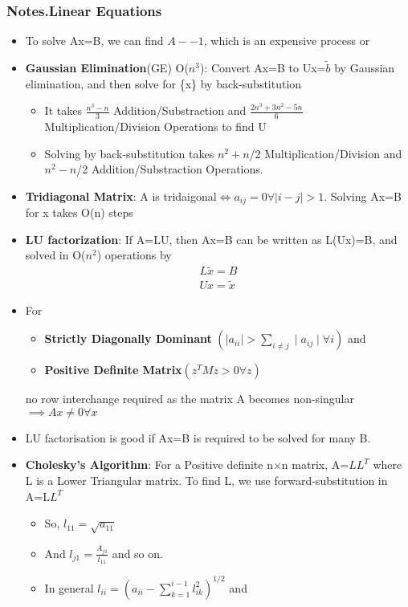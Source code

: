 \documentclass[12pt,letterpaper]{article}
\newcommand\asgnname{Notes}         %
\newenvironment{answer}[1]{
  \subsubsection*{%
  \asgnname.#1}
}{\newpage}
\begin{document}
\begin{answer}{Linear Equations}
\begin{itemize}
    \item To solve Ax=B, we can find $A-{-1}$, which is an expensive process or
    \item \textbf{Gaussian Elimination}(GE) O($n^3$): Convert Ax=B to Ux=$\tilde{b}$ by Gaussian elimination, and then solve for \{x\} by back-substitution
    \begin{itemize}
        \item It takes $\frac{n^3-n}{3}$ Addition/Substraction and $\frac{2n^3+3n^2-5n}{6}$ Multiplication/Division Operations to find U
        \item Solving by back-substitution takes $n^2+n$/2 Multiplication/Division and $n^2-n$/2 Addition/Substraction Operations.
    \end{itemize}
    \item \textbf{Tridiagonal Matrix}: A is tridaigonal$\iff a_{ij}=0 \forall \mid i-j \mid>1$. Solving Ax=B for x takes O(n) steps
    \item \textbf{LU factorization}: If A=LU, then Ax=B can be written as L(Ux)=B, and solved in O($n^2$) operations by
    \begin{align}
        L\tilde{x} = B\\
        Ux = \tilde{x}
    \end{align}
    \item For 
    \begin{itemize}
        \item \textbf{Strictly Diagonally Dominant} $\left( \mid a_{ii} \mid > \sum _{i \not= j} \mid a_{ij} \mid \forall i\right)$ and 
        \item \textbf{Positive Definite Matrix}$( z^TMz > 0 \forall z)$
    \end{itemize}
    no row interchange required as the matrix A becomes non-singular$\implies Ax \not= 0 \forall x$
    \item LU factorisation is good if Ax=B is required to be solved for many B.
    \item \textbf{Cholesky's Algorithm}: For a Positive definite n$\times$n matrix, A=$LL^T$ where L is a Lower Triangular matrix. To find L, we use forward-substitution in A=L$L^T$
    \begin{itemize}
        \item So, $l_{11} = \sqrt{a_{11}}$
        \item And $l_{j1} = \frac{A_{j1}}{l_{11}}$ and so on.
        \item In general $l_{ii} = (a_{ii} - \sum _{k=1}^{i-1} l^2_{ik})^{1/2}$ and

\end{itemize}
\end{itemize}
\end{answer}
\end{document}
